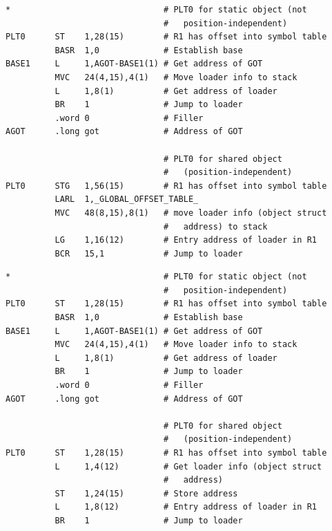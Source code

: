\documentclass[USenglish,fontsize=11pt,twoside,%
  toc=bib,toc=idx,toc=graduated,numbers=noendperiod,
  bookmarks=true,
  bookmarksnumbered=true,
  bookmarksopen=true,
  bookmarksopenlevel=1,
  breaklinks=true,
  colorlinks=true,
  linkcolor=black,
  pdfpagelayout={TwoPageRight},
  pdfusetitle=true
]{scrreprt}
\begin{document}
\ifzseries
\begin{lstlisting}[style=float,language=simpleasm,label=lst:plt0ex,
  caption=Special first entry in Procedure Linkage Table]
*                               # PLT0 for static object (not
                                #   position-independent)
PLT0      ST    1,28(15)        # R1 has offset into symbol table
          BASR  1,0             # Establish base
BASE1     L     1,AGOT-BASE1(1) # Get address of GOT
          MVC   24(4,15),4(1)   # Move loader info to stack
          L     1,8(1)          # Get address of loader
          BR    1               # Jump to loader
          .word 0               # Filler
AGOT      .long got             # Address of GOT

                                # PLT0 for shared object
                                #   (position-independent)
PLT0      STG   1,56(15)        # R1 has offset into symbol table
          LARL  1,_GLOBAL_OFFSET_TABLE_
          MVC   48(8,15),8(1)   # move loader info (object struct
                                #   address) to stack
          LG    1,16(12)        # Entry address of loader in R1
          BCR   15,1            # Jump to loader
\end{lstlisting}
\else
\begin{lstlisting}[style=float,language=simpleasm,label=lst:plt0ex,
  caption=Special first entry in Procedure Linkage Table]
*                               # PLT0 for static object (not
                                #   position-independent)
PLT0      ST    1,28(15)        # R1 has offset into symbol table
          BASR  1,0             # Establish base
BASE1     L     1,AGOT-BASE1(1) # Get address of GOT
          MVC   24(4,15),4(1)   # Move loader info to stack
          L     1,8(1)          # Get address of loader
          BR    1               # Jump to loader
          .word 0               # Filler
AGOT      .long got             # Address of GOT

                                # PLT0 for shared object
                                #   (position-independent)
PLT0      ST    1,28(15)        # R1 has offset into symbol table
          L     1,4(12)         # Get loader info (object struct
                                #   address)
          ST    1,24(15)        # Store address
          L     1,8(12)         # Entry address of loader in R1
          BR    1               # Jump to loader
\end{lstlisting}
\fi
\end{document}
